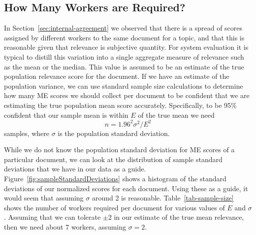 



\subsection{How Many Workers are Required?}
\label{sec:how-many-workers}


In Section~\ref{sec:internal-agreement} we observed that there is a
spread of scores assigned by different workers to the same document for
a topic, and that this is reasonable given that relevance is subjective
quantity.
For system evaluation it is typical to distill this variation into a
single aggregate measure of relevance such as the mean or the median.
This value is assumed to be an estimate of the true population
relevance score for the document.
If we have an estimate of the population variance, we can use standard
sample size calculations to determine how many ME scores we should
collect per document to be confident that we are estimating the true
population mean score accurately.
Specifically, to be 95\% confident that our sample mean is within $E$
of the true mean we need $$ n=1.96^2 \sigma^2 / E^2 $$ samples, where
$\sigma$ is the population standard deviation.

While we do not know the population standard deviation for ME scores 
of a particular document, we can look at the distribution of sample standard deviations
that we have in our data as a guide. 
Figure~\ref{fig:sampleStandardDeviations} shows a histogram of 
the standard deviations of our normalized scores for each document.
Using these as a guide, it would seem that assuming $\sigma$ around 2 is reasonable.
Table~\ref{tab-sample-size} shows the number of workers required per document 
for various values of $E$ and $\sigma$. 
Assuming that we can tolerate $\pm 2$ in our estimate of the true mean relevance, 
then we need about 7 workers, assuming $\sigma=2$.

